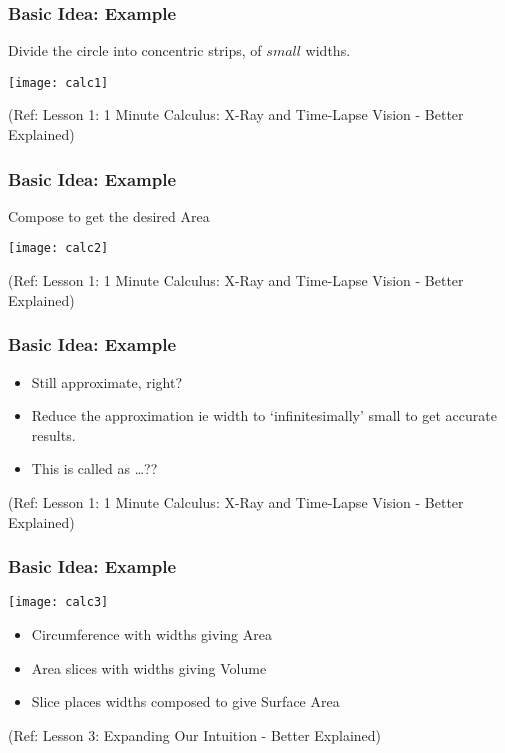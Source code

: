  \begin{frame}[fragile]\frametitle{Basic Idea: Example}
Divide the circle into concentric strips, of $small$ widths.

\begin{center}
\texttt{[image: calc1]}
\end{center}

\tiny{(Ref: Lesson 1: 1 Minute Calculus: X-Ray and Time-Lapse Vision - Better Explained)}
\end{frame}

 \begin{frame}[fragile]\frametitle{Basic Idea: Example}
Compose to get the desired Area
\begin{center}
\texttt{[image: calc2]}
\end{center}

\tiny{(Ref: Lesson 1: 1 Minute Calculus: X-Ray and Time-Lapse Vision - Better Explained)}
\end{frame}

 \begin{frame}[fragile]\frametitle{Basic Idea: Example}

\begin{itemize}
\item Still approximate, right?
\item Reduce the approximation ie width to `infinitesimally' small to get accurate results.
\item This is called as \ldots ??
\end{itemize}

\tiny{(Ref: Lesson 1: 1 Minute Calculus: X-Ray and Time-Lapse Vision - Better Explained)}
\end{frame}

 \begin{frame}[fragile]\frametitle{Basic Idea: Example}
 
\begin{center}
\texttt{[image: calc3]}
\end{center}


\begin{itemize}
\item Circumference with widths giving Area
\item Area slices with widths giving Volume
\item Slice places widths composed to give Surface Area
\end{itemize}

\tiny{(Ref: Lesson 3: Expanding Our Intuition - Better Explained)}
\end{frame}


